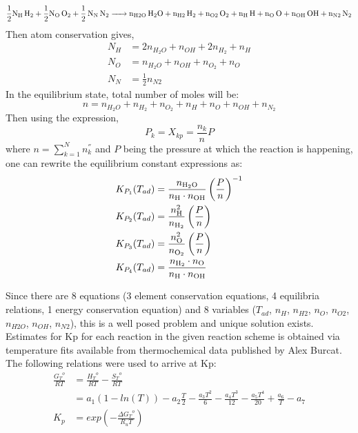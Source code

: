 \documentclass[a4paper,fleqn]{article}
\begin{document}
	\begin{equation*}
	\ce{\frac{1}{2}N_H H2 + \frac{1}{2}N_O O2 + \frac{1}{2} N_{N} N2 -> n_{H2O} H2O + n_{H2} H2 + n_{O2} O2 + n_H H + n_O O + n_{OH} OH +n_{N2} N2}
	\end{equation*}
	Then atom conservation gives,
	\begin{equation*}
	\begin{split}
	N_H &= 2 n_{H_2O} + n_{OH} + 2 n_{H_2} + n_{H}\\
	N_O &= n_{H_2O} + n_{OH} + n_{O_2} + n_{O}\\
	N_N &= \frac{1}{2} n_{N2}
	\end{split}
	\end{equation*}
	In the equilibrium state, total number of moles will be:
	\begin{equation*}
	n = n_{H_2O} + n_{H_2} + n_{O_2} + n_{H} + n_{O} + n_{OH} + n_{N_2}
	\end{equation*}
	Then using the expression,
	\begin{equation*}
	P_k = X_{kp} = \frac{n_k}{n} P
	\end{equation*}
	where $n = \sum_{k=1}^{N} n_k^{''}$ and $P$ being the pressure at which the reaction is happening, one can rewrite the equilibrium constant expressions as:
	\begin{equation*}
	\begin{split}
	&K_{P_{1}}(T_{ad}) = \frac{n_{\ce{H2O}}}{n_{\ce{H}} \cdot n_{\ce{OH}}}\left(\frac{P}{n}\right)^{-1}\\
	&K_{P_{2}}(T_{ad}) = \frac{n^2_{\ce{H}}}{n_{\ce{H2}}}\left(\frac{P}{n}\right)\\
	&K_{P_{3}}(T_{ad}) = \frac{n^2_{\ce{O}}}{n_{\ce{O2}}}\left(\frac{P}{n}\right)\\
	&K_{P_{4}}(T_{ad}) = \frac{n_{\ce{H2}} \cdot n_{\ce{O}}}{n_{\ce{H}} \cdot n_{\ce{OH}}}
	\end{split}
	\end{equation*}
	
	Since there are 8 equations (3 element conservation equations, 4 equilibria relations, 1 energy conservation equation) and 8 variables ($T_{ad}$, $n_{H}$, $n_{H2}$, $n_{O}$, $n_{O2}$, $n_{H2O}$, $n_{OH}$, $n_{N2}$), this is a well posed problem and unique solution exists.\\
	Estimates for Kp for each reaction in the given reaction scheme is obtained via temperature fits available from thermochemical data published by Alex Burcat. The following relations were used to arrive at Kp:
	\begin{equation*}
	\begin{split}
	\frac{{G_T}^o}{RT} &= \frac{{H_T}^o}{RT} - \frac{{S_T}^o}{RT}\\
	&= a_1 ( 1 - ln(T)) - a_2 \frac{T}{2} - \frac{a_3T^2}{6} - \frac{a_4T^3}{12} - \frac{a_5T^4}{20} + \frac{a_6}{T} -a_7	\\
	K_p &= exp \left(-\frac{\Delta {G_T}^o}{R_uT} \right)
	\end{split}
	\end{equation*}
	
\end{document}
